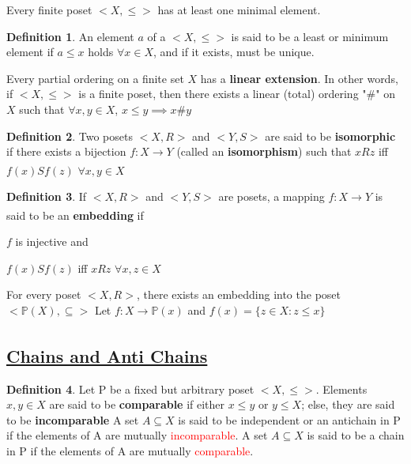 \documentclass{article}
\theoremstyle{definition}
\newtheorem*{defi}{Definition}
\theoremstyle{definition}
\newenvironment{manualprop}[1]{%
  \renewcommand\themanualpropinner{#1}%
  \manualpropinner
}{\endmanualpropinner}
\theoremstyle{named}
\begin{document}
\begin{manualprop}{5}
Every finite poset $<X, \leq>$ has at least one minimal element.
\end{manualprop}

\begin{defi}
An element $a$ of a $<X, \leq>$ is said to be a least or minimum element if $a \leq x$ holds  $\forall x \in X$, and if it exists, must be unique.
\end{defi}

\begin{manualprop}{6}
Every partial ordering on a finite set $X$ has a \textbf{linear extension}. In other words, if $<X, \leq>$ is a finite poset, then there exists a linear (total) ordering "$\#$" on $X$ such that $\forall x, y \in X$, $x \leq y \implies x \# y$
\end{manualprop}

\begin{defi}
Two posets $<X, R>$ and $<Y, S>$ are said to be \textbf{isomorphic} if there exists a bijection $f: X \xrightarrow[]{} Y$ (called an \textbf{isomorphism}) such that $xRz$ iff $f(x)Sf(z)$ $\forall x, y \in X$ 
\end{defi}

\begin{defi}
If $<X, R>$ and $<Y, S>$ are posets, a mapping $f: X \xrightarrow[]{} Y$ is said to be an \textbf{embedding} if 
\begin{compactenum}
\item $f$ is injective and 
\item $f(x)Sf(z)$ iff $xRz$ $\forall x, z \in X$
\end{compactenum}
\end{defi}

\begin{manualprop}{7}
For every poset $<X, R>$, there exists an embedding into the poset $<\mathbb{P}(X), \subseteq>$
\end{manualprop}
Let $f: X \xrightarrow[]{} \mathbb{P}(x)$ and 
$ f(x) = \{z \in X: z \leq x\} $

\subsection{\underline{Chains and Anti Chains}}
\begin{defi}
Let P be a fixed but arbitrary poset $<X, \leq>$. Elements $x, y \in X$ are said to be \textbf{comparable} if either $x \leq y$ or $ y \leq X$; else, they are said to be \textbf{incomparable}
\newline
A set $A \subseteq X$ is said to be independent or an antichain in P if the elements of A are mutually \textcolor{red}{incomparable}. A set $A \subseteq X$ is said to be a chain in P if the elements of A are mutually \textcolor{red}{comparable}.
\end{defi}
\end{document}
